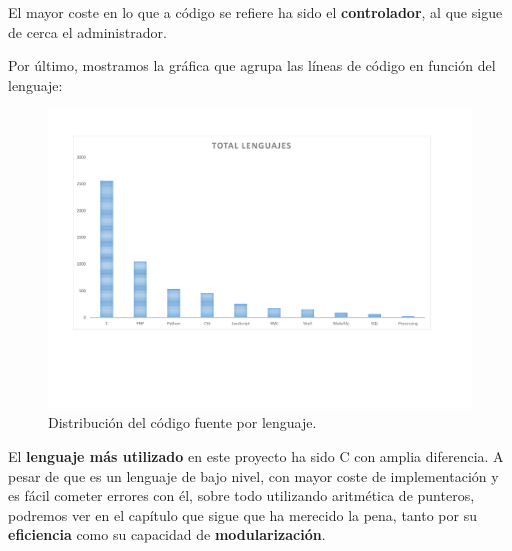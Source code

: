 \smallskip

El mayor coste en lo que a código se refiere ha sido el \textbf{controlador}, al que sigue de cerca el administrador.

Por último, mostramos la gráfica que agrupa las líneas de código en función del lenguaje:

\smallskip

\begin{figure}[H]
	\noindent \begin{centering}
		\includegraphics[clip=true,trim=50 150 50 50,width=\linewidth]{capitulo5/lineas_lenguajes}
		\par\end{centering}
	\smallskip
	\caption{\label{fig:lineas_lenguajes} Distribución del código fuente por lenguaje.}
\end{figure} 

\smallskip

El \textbf{lenguaje más utilizado} en este proyecto ha sido C con amplia diferencia. A pesar de que es un lenguaje de bajo nivel, con mayor coste de implementación y es fácil cometer errores con él, sobre todo utilizando aritmética de punteros, podremos ver en el capítulo que sigue que ha merecido la pena, tanto por su \textbf{eficiencia} como su capacidad de \textbf{modularización}.